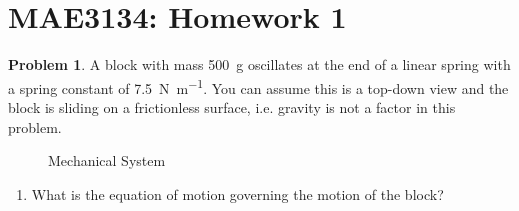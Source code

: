 \documentclass[10pt]{article}
\date{}
\theoremstyle{definition}
\newtheorem{prob}{Problem}[section]
\newenvironment{subprob}%
{\renewcommand{\theenumi}{\alph{enumi}}\renewcommand{\labelenumi}{(\theenumi)}\begin{enumerate}}%
{\end{enumerate}}%
\begin{document}
\pagestyle{empty}
\section*{MAE3134: Homework 1}
\vspace*{-0.4cm}


\begin{prob}
    A block with mass \SI{500}{\gram} oscillates at the end of a linear spring with a spring constant of \SI{7.5}{\newton\per\meter}.
    You can assume this is a top-down view and the block is sliding on a frictionless surface, i.e. gravity is not a factor in this problem.


    \begin{figure}[h]
        \centering
        \begin{scaletikzpicturetowidth}{0.5\textwidth}
        \end{scaletikzpicturetowidth}
        \caption{Mechanical System~\label{fig:mechanical_system}}
    \end{figure}

    \begin{subprob}
    \item What is the equation of motion governing the motion of the block?
    \end{subprob}
\end{prob}
\end{document}
